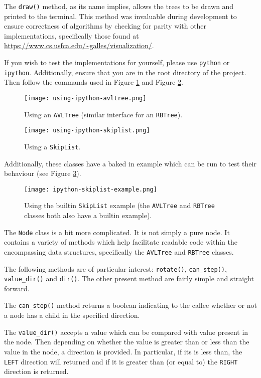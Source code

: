 \documentclass[article]{uom-coursework}
\begin{document}
The \texttt{draw()} method, as its name implies, allows the
trees to be drawn and printed to the terminal. This method was
invaluable during development to ensure correctness of
algorithms by checking for parity with other implementations,
specifically those found at
\url{https://www.cs.usfca.edu/~galles/visualization/}.

If you wish to test the implementations for yourself, please use
\texttt{python} or \texttt{ipython}. Additionally, ensure that
you are in the root directory of the project. Then follow the
commands used in Figure \ref{fig:ipythonavl} and Figure
\ref{fig:ipythonskip}.

\begin{figure}[H]
\centering
\texttt{[image: using-ipython-avltree.png]}
\caption{Using an \texttt{AVLTree} (similar
interface for an \texttt{RBTree}).}
\label{fig:ipythonavl}
\end{figure}

\begin{figure}[H]
\centering
\texttt{[image: using-ipython-skiplist.png]}
\caption{Using a \texttt{SkipList}.}
\label{fig:ipythonskip}
\end{figure}

Additionally, these classes have a baked in example which can be
run to test their behaviour (see Figure \ref{fig:example}).

\begin{figure}[H]
\centering
\texttt{[image: ipython-skiplist-example.png]}
\caption{Using the builtin \texttt{SkipList} example (the
\texttt{AVLTree} and \texttt{RBTree} classes both also have a
builtin example).}
\label{fig:example}
\end{figure}

The \texttt{Node} class is a bit more complicated. It is not
simply a pure node. It contains a variety of methods which help
facilitate readable code within the encompassing data
structures, specifically the \texttt{AVLTree} and
\texttt{RBTree} classes.

The following methods are of particular interest:
\texttt{rotate()}, \texttt{can\_step()}, \texttt{value\_dir()}
and \texttt{dir()}. The other present method are fairly simple
and straight forward.

The \texttt{can\_step()} method returns a boolean indicating to
the callee whether or not a node has a child in the specified
direction.

The \texttt{value\_dir()} accepts a value which can be compared
with value present in the node. Then depending on whether the
value is greater than or less than the value in the node, a
direction is provided. In particular, if its is less than, the
\texttt{LEFT} direction will returned and if it is greater than
(or equal to) the \texttt{RIGHT} direction is returned.
\end{document}
